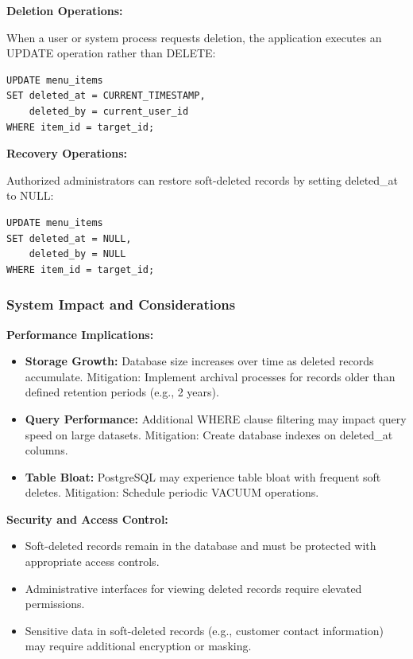 \documentclass[12pt,a4paper]{article}
\begin{document}
\begin{tcolorbox}[colback=primaryblue!5, colframe=primaryblue, boxrule=1pt, arc=3pt, left=10pt, right=10pt, top=8pt, bottom=8pt]
\textbf{Deletion Operations:}

When a user or system process requests deletion, the application executes an UPDATE operation rather than DELETE:

\begin{verbatim}
UPDATE menu_items 
SET deleted_at = CURRENT_TIMESTAMP,
    deleted_by = current_user_id
WHERE item_id = target_id;
\end{verbatim}

\vspace{0.5em}

\textbf{Recovery Operations:}

Authorized administrators can restore soft-deleted records by setting deleted\_at to NULL:

\begin{verbatim}
UPDATE menu_items 
SET deleted_at = NULL,
    deleted_by = NULL
WHERE item_id = target_id;
\end{verbatim}

\subsubsection{System Impact and Considerations}

\textbf{Performance Implications:}

\begin{itemize}[leftmargin=2em, itemsep=6pt]
    \item \textbf{Storage Growth:} Database size increases over time as deleted records accumulate. Mitigation: Implement archival processes for records older than defined retention periods (e.g., 2 years).
    \item \textbf{Query Performance:} Additional WHERE clause filtering may impact query speed on large datasets. Mitigation: Create database indexes on deleted\_at columns.
    \item \textbf{Table Bloat:} PostgreSQL may experience table bloat with frequent soft deletes. Mitigation: Schedule periodic VACUUM operations.
\end{itemize}

\vspace{0.5em}

\textbf{Security and Access Control:}

\begin{itemize}[leftmargin=2em, itemsep=6pt]
    \item Soft-deleted records remain in the database and must be protected with appropriate access controls.
    \item Administrative interfaces for viewing deleted records require elevated permissions.
    \item Sensitive data in soft-deleted records (e.g., customer contact information) may require additional encryption or masking.
\end{itemize}


\end{tcolorbox}
\end{document}
